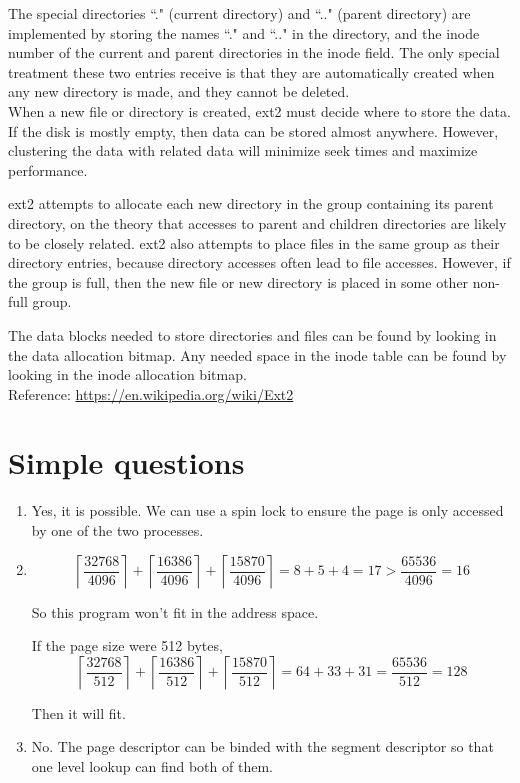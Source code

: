 \documentclass{article}
\begin{document}
The special directories ``." (current directory) and ``.." (parent directory) are implemented by storing the names ``." and ``.." in the directory, and the inode number of the current and parent directories in the inode field. The only special treatment these two entries receive is that they are automatically created when any new directory is made, and they cannot be deleted.\\

When a new file or directory is created, ext2 must decide where to store the data. If the disk is mostly empty, then data can be stored almost anywhere. However, clustering the data with related data will minimize seek times and maximize performance.

ext2 attempts to allocate each new directory in the group containing its parent directory, on the theory that accesses to parent and children directories are likely to be closely related. ext2 also attempts to place files in the same group as their directory entries, because directory accesses often lead to file accesses. However, if the group is full, then the new file or new directory is placed in some other non-full group.

The data blocks needed to store directories and files can be found by looking in the data allocation bitmap. Any needed space in the inode table can be found by looking in the inode allocation bitmap.\\

Reference: \url{https://en.wikipedia.org/wiki/Ext2}

\section{Simple questions}
\begin{enumerate}
\item
Yes, it is possible. We can use a spin lock to ensure the page is only accessed by one of the two processes.

\item
$$\left\lceil\frac{32768}{4096}\right\rceil
+\left\lceil\frac{16386}{4096}\right\rceil
+\left\lceil\frac{15870}{4096}\right\rceil
=8+5+4=17>\frac{65536}{4096}=16$$

So this program won't fit in the address space.

If the page size were 512 bytes,
$$\left\lceil\frac{32768}{512}\right\rceil
+\left\lceil\frac{16386}{512}\right\rceil
+\left\lceil\frac{15870}{512}\right\rceil
=64+33+31=\frac{65536}{512}=128$$

Then it will fit.
\item
No. The page descriptor can be binded with the segment descriptor so that one level lookup can find both of them.

\end{enumerate}
\end{document}
